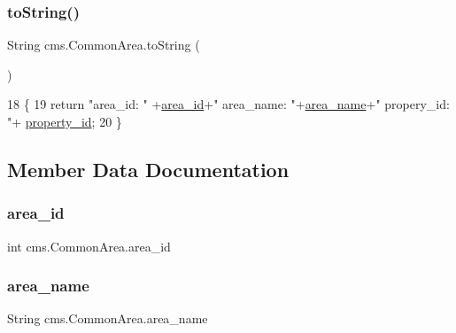 \subsubsection{\texorpdfstring{to\+String()}{toString()}}
{\footnotesize\ttfamily String cms.\+Common\+Area.\+to\+String (\begin{DoxyParamCaption}{ }\end{DoxyParamCaption})\hspace{0.3cm}{\ttfamily [inline]}}


\begin{DoxyCode}
18                             \{
19         \textcolor{keywordflow}{return}  \textcolor{stringliteral}{"area\_id: "} +\mbox{\hyperlink{classcms_1_1_common_area_a60b2c63a3a45ca2ac12dc5aa6cd9c8c6}{area\_id}}+\textcolor{stringliteral}{" area\_name: "}+\mbox{\hyperlink{classcms_1_1_common_area_a5f5060702efd265baeb61a83a9135088}{area\_name}}+\textcolor{stringliteral}{" propery\_id: "}+
      \mbox{\hyperlink{classcms_1_1_common_area_ad40e54e3b27cd75b9010bb8bc3d3acca}{property\_id}};
20     \}
\end{DoxyCode}


\subsection{Member Data Documentation}
\mbox{\label{classcms_1_1_common_area_a60b2c63a3a45ca2ac12dc5aa6cd9c8c6}} 
\subsubsection{\texorpdfstring{area\+\_\+id}{area\_id}}
{\footnotesize\ttfamily int cms.\+Common\+Area.\+area\+\_\+id\hspace{0.3cm}{\ttfamily [package]}}

\mbox{\label{classcms_1_1_common_area_a5f5060702efd265baeb61a83a9135088}} 
\subsubsection{\texorpdfstring{area\+\_\+name}{area\_name}}
{\footnotesize\ttfamily String cms.\+Common\+Area.\+area\+\_\+name\hspace{0.3cm}{\ttfamily [package]}}


